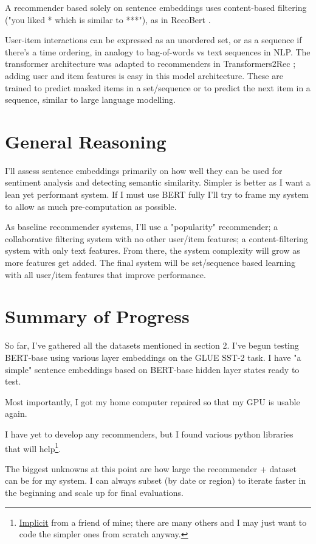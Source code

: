 \documentclass[11pt]{article}
\begin{document}
A recommender based solely on sentence embeddings uses content-based filtering ("you liked * which is similar to ***"), as in RecoBert \cite{Malkiel2020}.

User-item interactions can be expressed as an unordered set, or as a sequence if there's a time ordering, in analogy to bag-of-words vs text sequences in NLP. The transformer architecture was adapted to recommenders in Transformers2Rec \cite{Transformers4Rec}; adding user and item features is easy in this model architecture. These are trained to predict masked items in a set/sequence or to predict the next item in a sequence, similar to large language modelling.

\section{General Reasoning} 

I'll assess sentence embeddings primarily on how well they can be used for sentiment analysis and detecting semantic similarity. Simpler is better as I want a lean yet performant system. If I must use BERT fully I'll try to frame my system to allow as much pre-computation as possible.

As baseline recommender systems, I'll use a "popularity" recommender; a collaborative filtering system with no other user/item features; a content-filtering system with only text features. From there, the system complexity will grow as more features get added. The final system will be set/sequence based learning with all user/item features that improve performance. 

\section{Summary of Progress} 

So far, I've gathered all the datasets mentioned in section 2. I've begun testing BERT-base using various layer embeddings on the GLUE SST-2 task. I have "a simple" sentence embeddings based on BERT-base hidden layer states ready to test.

Most importantly, I got my home computer repaired so that my GPU is usable again. 

I have yet to develop any recommenders, but I found various python libraries that will help\footnote[2]{\href{https://github.com/benfred/implicit}{Implicit} from a friend of mine; there are many others and I may just want to code the simpler ones from scratch anyway.}. 

The biggest unknowns at this point are how large the recommender + dataset can be for my system. I can always subset (by date or region) to iterate faster in the beginning and scale up for final evaluations.





\end{document}

